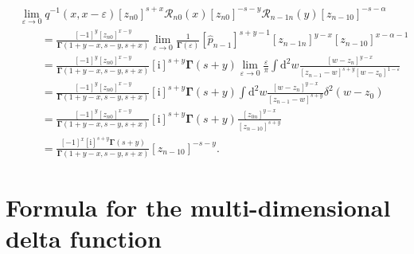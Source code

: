 \documentclass[pdftex]{sigma}
\renewcommand{\imath}{\mathrm{i}}
\numberwithin{equation}{section}
\begin{document}
\begin{align*}
&
\lim\limits_{\varepsilon\to 0}
q^{-1}(x,x-\varepsilon)
[z_{n0}]^{s+x} \mathcal{R}_{n 0}(x) [z_{n0}]^{-s-y}
\mathcal{R}_{n-1 n}(y) [z_{n-1 0}]^{-s-\alpha} \\
&\qquad =
\frac{[-1]^{y} [z_{n0}]^{x-y}}{\mathbf{\Gamma}(1+y-x,s-y,s+x)}
\lim\limits_{\varepsilon\to 0}
\frac{1}
{\mathbf{\Gamma}(\varepsilon)}
[\hat{p}_{n-1}]^{s+y-1} [z_{n-1 n}]^{y-x} [z_{n-1 0}]^{x-\alpha-1} \\
&\qquad =
\frac{[-1]^{y} [z_{n0}]^{x-y}}
{\mathbf{\Gamma}(1+y-x,s-y,s+x)}
[\imath]^{s+y} \bm{\Gamma}(s+y)
\lim\limits_{\varepsilon\to 0} \frac{\varepsilon}{\pi}
\int \mathrm{d}^2 w \frac{[w-z_{n}]^{y-x}}
{[z_{n-1}-w]^{s+y} [w-z_0]^{1-\varepsilon}} \\
&\qquad =
\frac{[-1]^{y} [z_{n0}]^{x-y}}
{\mathbf{\Gamma}(1+y-x,s-y,s+x)}
[\imath]^{s+y} \bm{\Gamma}(s+y)
\int \mathrm{d}^2 w \frac{[w-z_{n}]^{y-x}}
{[z_{n-1}-w]^{s+y}}
\delta^2(w-z_0) \\
&\qquad =
\frac{[-1]^{y} [z_{n0}]^{x-y}}
{\mathbf{\Gamma}(1+y-x,s-y,s+x)}
[\imath]^{s+y} \bm{\Gamma}(s+y) \frac{[z_{0 n}]^{y-x}}
{[z_{n-1 0}]^{s+y}} \\
&\qquad =
\frac{[-1]^{x} [\imath]^{s+y} \mathbf{\Gamma}(s+y)}
{\mathbf{\Gamma}(1+y-x,s-y,s+x)} [z_{n-1 0}]^{-s-y} .
\end{align*}

\section{Formula for the multi-dimensional delta function}
\end{document}
